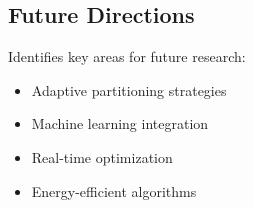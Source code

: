 \subsection{Future Directions}
Identifies key areas for future research:
\begin{itemize}
    \item Adaptive partitioning strategies
    \item Machine learning integration
    \item Real-time optimization
    \item Energy-efficient algorithms
\end{itemize} 